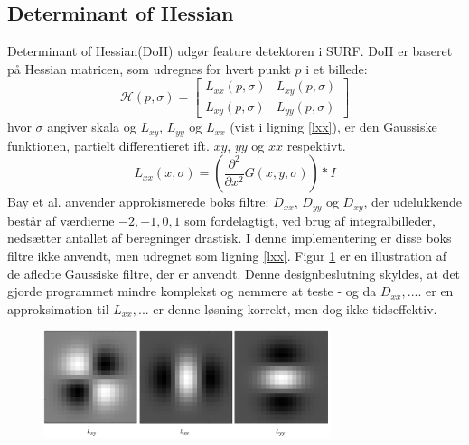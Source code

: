 \subsection{Determinant of Hessian}
Determinant of Hessian(DoH) udgør feature detektoren i SURF. DoH er baseret på Hessian matricen, som udregnes for hvert punkt $p$ i et billede:
\begin{equation}
\mathcal{H}(p, \sigma) = 
 \begin{bmatrix}
 	L_{xx}(p, \sigma) & L_{xy}(p, \sigma) \\
 	L_{xy}(p, \sigma) & L_{yy}(p, \sigma) 
 \end{bmatrix}
 \label{hessianmatrix}
\end{equation}
hvor $\sigma$ angiver skala og $L_{xy} $, $L_{yy}$ og $L_{xx}$ (vist i ligning \eqref{lxx}), er den Gaussiske funktionen, partielt differentieret ift. $xy$, $yy$ og $xx$ respektivt.
\begin{equation}
L_{xx}(x, \sigma) = (\frac{\partial^2 }{\partial x^2 } G(x,y,\sigma)) * I
\label{lxx}
\end{equation}
Bay et al. anvender approkismerede boks filtre: $D_{xx}$, $D_{yy}$ og $D_{xy}$, der udelukkende består af værdierne $-2,-1,0, 1$ som fordelagtigt, ved brug af integralbilleder, nedsætter antallet af beregninger drastisk. I denne implementering er disse boks filtre ikke anvendt, men udregnet som ligning \eqref{lxx}. Figur \ref{fig:lxxlyylxy} er en illustration af de afledte Gaussiske filtre, der er anvendt. Denne designbeslutning skyldes, at det gjorde programmet mindre komplekst og nemmere at teste - og da $D_{xx}, ....$ er en approksimation til $L_{xx},...$ er denne løsning korrekt, men dog ikke tidseffektiv. 
\begin{figure}[H]
    \centering
    \includegraphics[width=0.75\textwidth]{fig/31.png}
     \vspace{-0.5em}
    \begin{center}    
       \caption{\textcolor{gray}{\footnotesize \textit{ }}}
    \label{fig:lxxlyylxy}
     \end{center}
     \vspace{-2.5em}
  \end{figure} \noindent

